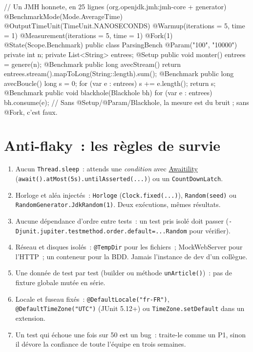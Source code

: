 \documentclass[12pt,a4paper,twoside,openright]{book}
\newcommand{\link}[2]{\href{#2}{#1}}
\begin{document}
\begin{codejava}
// Un JMH honnete, en 25 lignes (org.openjdk.jmh:jmh-core + generator)
@BenchmarkMode(Mode.AverageTime) @OutputTimeUnit(TimeUnit.NANOSECONDS)
@Warmup(iterations = 5, time = 1) @Measurement(iterations = 5, time = 1) @Fork(1) @State(Scope.Benchmark)
public class ParsingBench {
    @Param({"100", "10000"}) private int n;
    private List<String> entrees;
    @Setup public void monter() { entrees = genere(n); }
    @Benchmark public long avecStream() { return entrees.stream().mapToLong(String::length).sum(); }
    @Benchmark public long avecBoucle() { long s = 0; for (var e : entrees) { s += e.length(); } return s; }
    @Benchmark public void blackhole(Blackhole bh) { for (var e : entrees) { bh.consume(e); } }
}
// Sans @Setup/@Param/Blackhole, la mesure est du bruit ; sans @Fork, c'est faux.
\end{codejava}

\section{Anti-flaky~: les r\`egles de survie}

\begin{enumerate}
  \item Aucun \verb|Thread.sleep|~: attends une \emph{condition} avec \link{Awaitility}{https://github.com/awaitility/awaitility}
        (\verb|await().atMost(5s).untilAsserted(...)|) ou un \verb|CountDownLatch|.
  \item Horloge et al\'ea inject\'es~: \verb|Horloge| (\verb|Clock.fixed(...)|), \verb|Random(seed)| ou
        \verb|RandomGenerator.JdkRandom(1)|. Deux ex\'ecutions, m\^emes r\'esultats.
  \item Aucune d\'ependance d'ordre entre tests~: un test pris isol\'e doit passer
        (\verb|-Djunit.jupiter.testmethod.order.default=...Random| pour v\'erifier).
  \item R\'eseau et disques isol\'es~: \verb|@TempDir| pour les fichiers~; MockWebServer pour l'HTTP~;
        un conteneur pour la BDD. Jamais l'instance de dev d'un coll\`egue.
  \item Une donn\'ee de test par test (builder ou m\'ethode \verb|unArticle()|)~: pas de fixture
        globale mut\'ee en s\'erie.
  \item Locale et fuseau fix\'es~: \verb|@DefaultLocale("fr-FR")|, \verb|@DefaultTimeZone("UTC")|
        (JUnit 5.12+) ou \verb|TimeZone.setDefault| dans un extension.
  \item Un test qui \'echoue une fois sur 50 est un bug~: traite-le comme un P1, sinon il d\'evore
        la confiance de toute l'\'equipe en trois semaines.
\end{enumerate}
\end{document}
